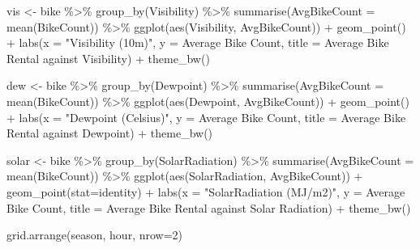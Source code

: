 \documentclass[
]{article}
\newenvironment{Shaded}{\begin{snugshade}}{\end{snugshade}}
\newcommand{\AttributeTok}[1]{\textcolor[rgb]{0.77,0.63,0.00}{#1}}
\newcommand{\DecValTok}[1]{\textcolor[rgb]{0.00,0.00,0.81}{#1}}
\newcommand{\FunctionTok}[1]{\textcolor[rgb]{0.00,0.00,0.00}{#1}}
\newcommand{\NormalTok}[1]{#1}
\newcommand{\OtherTok}[1]{\textcolor[rgb]{0.56,0.35,0.01}{#1}}
\newcommand{\SpecialCharTok}[1]{\textcolor[rgb]{0.00,0.00,0.00}{#1}}
\newcommand{\StringTok}[1]{\textcolor[rgb]{0.31,0.60,0.02}{#1}}
\begin{document}
\begin{Shaded}
\begin{Highlighting}[]
\NormalTok{vis }\OtherTok{\textless{}{-}}\NormalTok{ bike }\SpecialCharTok{\%\textgreater{}\%} \FunctionTok{group\_by}\NormalTok{(Visibility) }\SpecialCharTok{\%\textgreater{}\%}
  \FunctionTok{summarise}\NormalTok{(}\AttributeTok{AvgBikeCount =} \FunctionTok{mean}\NormalTok{(BikeCount)) }\SpecialCharTok{\%\textgreater{}\%}
  \FunctionTok{ggplot}\NormalTok{(}\FunctionTok{aes}\NormalTok{(Visibility, AvgBikeCount)) }\SpecialCharTok{+}
  \FunctionTok{geom\_point}\NormalTok{() }\SpecialCharTok{+} 
  \FunctionTok{labs}\NormalTok{(}\AttributeTok{x =} \StringTok{"Visibility (10m)"}\NormalTok{, }\AttributeTok{y =} \StringTok{\textquotesingle{}Average Bike Count\textquotesingle{}}\NormalTok{,}
       \AttributeTok{title =} \StringTok{\textquotesingle{}Average Bike Rental against Visibility\textquotesingle{}}\NormalTok{) }\SpecialCharTok{+} \FunctionTok{theme\_bw}\NormalTok{()}

\NormalTok{dew }\OtherTok{\textless{}{-}}\NormalTok{ bike }\SpecialCharTok{\%\textgreater{}\%} \FunctionTok{group\_by}\NormalTok{(Dewpoint) }\SpecialCharTok{\%\textgreater{}\%}
  \FunctionTok{summarise}\NormalTok{(}\AttributeTok{AvgBikeCount =} \FunctionTok{mean}\NormalTok{(BikeCount)) }\SpecialCharTok{\%\textgreater{}\%}
  \FunctionTok{ggplot}\NormalTok{(}\FunctionTok{aes}\NormalTok{(Dewpoint, AvgBikeCount)) }\SpecialCharTok{+}
  \FunctionTok{geom\_point}\NormalTok{() }\SpecialCharTok{+} 
  \FunctionTok{labs}\NormalTok{(}\AttributeTok{x =} \StringTok{"Dewpoint (Celsius)"}\NormalTok{, }\AttributeTok{y =} \StringTok{\textquotesingle{}Average Bike Count\textquotesingle{}}\NormalTok{,}
       \AttributeTok{title =} \StringTok{\textquotesingle{}Average Bike Rental against Dewpoint\textquotesingle{}}\NormalTok{) }\SpecialCharTok{+} \FunctionTok{theme\_bw}\NormalTok{()}

\NormalTok{solar }\OtherTok{\textless{}{-}}\NormalTok{ bike }\SpecialCharTok{\%\textgreater{}\%} \FunctionTok{group\_by}\NormalTok{(SolarRadiation) }\SpecialCharTok{\%\textgreater{}\%}
  \FunctionTok{summarise}\NormalTok{(}\AttributeTok{AvgBikeCount =} \FunctionTok{mean}\NormalTok{(BikeCount)) }\SpecialCharTok{\%\textgreater{}\%}
  \FunctionTok{ggplot}\NormalTok{(}\FunctionTok{aes}\NormalTok{(SolarRadiation, AvgBikeCount)) }\SpecialCharTok{+}
  \FunctionTok{geom\_point}\NormalTok{(}\AttributeTok{stat=}\StringTok{\textquotesingle{}identity\textquotesingle{}}\NormalTok{) }\SpecialCharTok{+} 
  \FunctionTok{labs}\NormalTok{(}\AttributeTok{x =} \StringTok{"SolarRadiation (MJ/m2)"}\NormalTok{, }\AttributeTok{y =} \StringTok{\textquotesingle{}Average Bike Count\textquotesingle{}}\NormalTok{,}
       \AttributeTok{title =} \StringTok{\textquotesingle{}Average Bike Rental against Solar Radiation\textquotesingle{}}\NormalTok{) }\SpecialCharTok{+} \FunctionTok{theme\_bw}\NormalTok{()}

\FunctionTok{grid.arrange}\NormalTok{(season, hour, }\AttributeTok{nrow=}\DecValTok{2}\NormalTok{)}
\end{Highlighting}
\end{Shaded}
\end{document}
